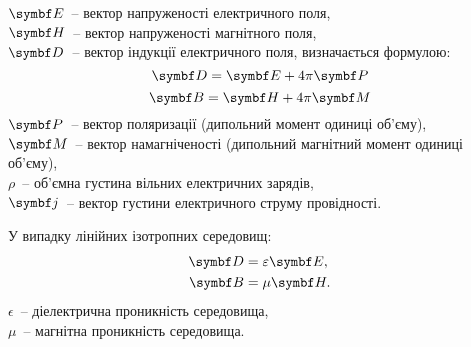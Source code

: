 
\noindent%
$ \Efield $~-- вектор напруженості електричного поля,\\
$ \Hfield $~-- вектор напруженості магнітного поля,\\
$ \Dfield $~-- вектор індукції електричного поля, визначається формулою:
\begin{equation}
	\Dfield = \Efield + 4\pi\vect{P}
\end{equation}
\begin{equation}
	\Bfield = \Hfield + 4\pi\vect{M}
\end{equation}
$ \vect{P} $~-- вектор поляризації (дипольний момент одиниці об'єму),\\
$ \vect{M} $~-- вектор намагніченості (дипольний магнітний момент одиниці об'єму),\\
$\rho$~-- об'ємна густина вільних електричних зарядів,\\
$\vect{j}$~-- вектор густини електричного струму провідності.

У випадку лінійних ізотропних середовищ:
\begin{align}
	\Dfield & = \epsilon\Efield, \\
	\Bfield & = \mu\Hfield.
\end{align}
$\epsilon$~-- діелектрична проникність середовища,\\
$\mu$~-- магнітна проникність середовища.

